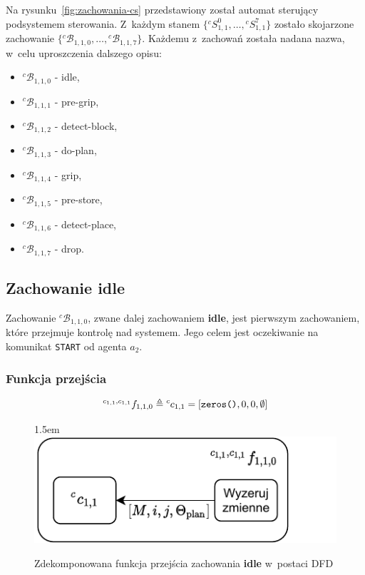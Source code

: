 Na rysunku~\ref{fig:zachowania-cs} przedstawiony został automat sterujący podsystemem sterowania. Z~każdym stanem $\{ {}^{c}S_{1,1}^0, \hdots, {}^{c}S_{1,1}^7 \}$ zostało skojarzone zachowanie $\{ {}^{c}\mathcal{B}_{1,1,0}, \hdots, {}^{c}\mathcal{B}_{1,1,7} \}$. Każdemu z~zachowań została nadana nazwa, w~celu uproszczenia dalszego opisu:
\begin{itemize}
    \item ${}^{c}\mathcal{B}_{1,1,0}$ - idle,
    \item ${}^{c}\mathcal{B}_{1,1,1}$ - pre-grip,
    \item ${}^{c}\mathcal{B}_{1,1,2}$ - detect-block,
    \item ${}^{c}\mathcal{B}_{1,1,3}$ - do-plan,
    \item ${}^{c}\mathcal{B}_{1,1,4}$ - grip,
    \item ${}^{c}\mathcal{B}_{1,1,5}$ - pre-store,
    \item ${}^{c}\mathcal{B}_{1,1,6}$ - detect-place,
    \item ${}^{c}\mathcal{B}_{1,1,7}$ - drop.
\end{itemize}

\subsection{Zachowanie idle}
\label{subsec:cs-idle}

Zachowanie ${}^{c}\mathcal{B}_{1,1,0}$, zwane dalej zachowaniem \textbf{idle}, jest pierwszym zachowaniem, które przejmuje kontrolę nad systemem. Jego celem jest oczekiwanie na komunikat \texttt{START} od agenta $a_{2}$.

\subsubsection{Funkcja przejścia}
\begin{equation}
{}^{c_{1,1}, c_{1,1}}f_{1,1,0} \triangleq {}^{c}c_{1,1} = [\text{\texttt{zeros()}}, 0, 0, \emptyset]  
\end{equation}

\begin{figure}[ht]
    \leftskip1.5em
    \includegraphics[width=\columnwidth]{figures/ISR-cs-fp-idle.pdf}
    \caption{Zdekomponowana funkcja przejścia zachowania \textbf{idle} w~postaci DFD}
    \label{fig:cs-fp-idle}
\end{figure}

